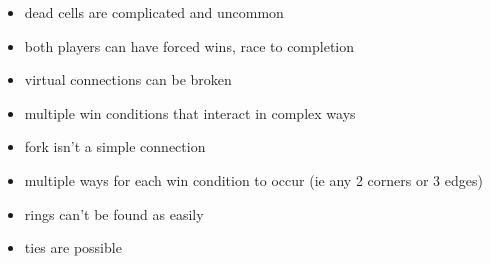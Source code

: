 \begin{itemize}
\item dead cells are complicated and uncommon
\item both players can have forced wins, race to completion
\item virtual connections can be broken
\item multiple win conditions that interact in complex ways
\item fork isn't a simple connection
\item multiple ways for each win condition to occur (ie any 2 corners or 3 edges)
\item rings can't be found as easily
\item ties are possible
\end{itemize}
